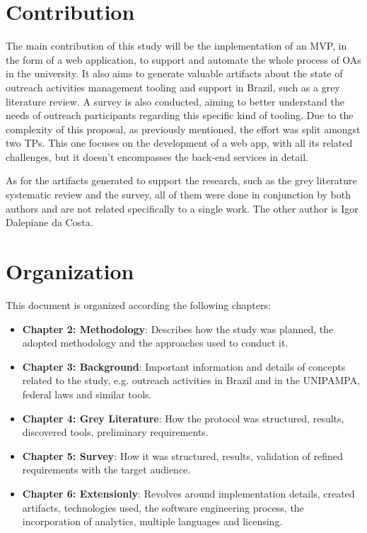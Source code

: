 \section{Contribution}\label{sec:contribution}

The main contribution of this study will be the implementation of an \ac{MVP}, in the form of a web application, to support and automate the whole process of \acp{OA} in the university. It also aims to generate valuable artifacts about the state of outreach activities management tooling and support in Brazil, such as a grey literature review. A survey is also conducted, aiming to better understand the needs of outreach participants regarding this specific kind of tooling. Due to the complexity of this proposal, as previously mentioned, the effort was split amongst two \acp{TP}. This one focuses on the development of a web app, with all its related challenges, but it doesn't encompasses the back-end services in detail.

As for the artifacts generated to support the research, such as the grey literature systematic review and the survey, all of them were done in conjunction by both authors and are not related specifically to a single work. The other author is Igor Dalepiane da Costa.

\section{Organization}\label{sec:organization}

This document is organized according the following chapters:

\begin{itemize}
  \item \textbf{Chapter 2: Methodology}: Describes how the study was planned, the adopted methodology and the approaches used to conduct it.
  \item \textbf{Chapter 3: Background}: Important information and details of concepts related to the study, e.g. outreach activities in Brazil and in the \acl{UNIPAMPA}, federal laws and similar tools.
  \item \textbf{Chapter 4: Grey Literature}: How the protocol was structured, results, discovered tools, preliminary requirements.
  \item \textbf{Chapter 5: Survey}: How it was structured, results, validation of refined requirements with the target audience.
  \item \textbf{Chapter 6: Extensionly}: Revolves around implementation details, created artifacts, technologies used, the software engineering process, the incorporation of analytics, multiple languages and licensing.
\end{itemize}
